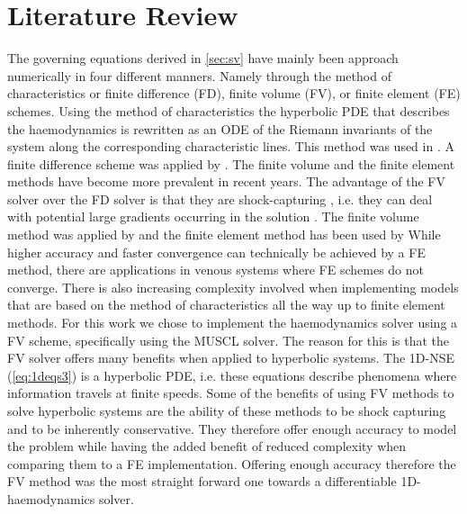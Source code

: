 \documentclass[a4paper, oneside]{discothesis}
\begin{document}
\section{Literature Review} \label{sec:lr}
The governing equations derived in \autoref{sec:sv} have mainly been approach numerically in four different manners.
Namely through the method of characteristics or finite difference (FD), finite volume (FV), or finite element (FE) schemes.
Using the method of characteristics the hyperbolic PDE that describes the haemodynamics is rewritten as an ODE of the Riemann invariants of the system along the corresponding characteristic lines.
This method was used in \cite{streeter1963pulsatile,bodley1971non,parker1990forward,wang2004wave,wang2003time}.
A finite difference scheme was applied by \cite{smith2002anatomically,elad1991numerical,elad1991numerical,pontrelli2003numerical,reymond2009validation}.
The finite volume and the finite element methods have become more prevalent in recent years.
The advantage of the FV solver over the FD solver is that they are shock-capturing \cite{toro2001shock}, i.e. they can deal with potential large gradients occurring in the solution \cite{shu1988efficient,harten1997uniformly}.
The finite volume method was applied by \cite{melis2017gaussian,brook1999numerical,brook2002model} and the finite element method has been used by \cite{sherwin2003one,sherwin2003computational,formaggia2001coupling,wan2002one,porenta1986finite,rooz1982finite,bessems2008experimental}
While higher accuracy and faster convergence can technically be achieved by a FE method, there are applications in venous systems where FE schemes do not converge.
There is also increasing complexity involved when implementing models that are based on the method of characteristics all the way up to finite element methods.
For this work we chose to implement the haemodynamics solver using a FV scheme, specifically using the MUSCL solver.
The reason for this is that the FV solver offers many benefits when applied to hyperbolic systems.
The 1D-NSE (\autoref{eq:1deqs3}) is a hyperbolic PDE, i.e. these equations describe phenomena where information travels at finite speeds. 
Some of the benefits of using FV methods to solve hyperbolic systems are the ability of these methods to be shock capturing and to be inherently conservative.
They therefore offer enough accuracy to model the problem while having the added benefit of reduced complexity when comparing them to a FE implementation.
Offering enough accuracy therefore the FV method was the most straight forward one towards a differentiable 1D-haemodynamics solver.
\end{document}
